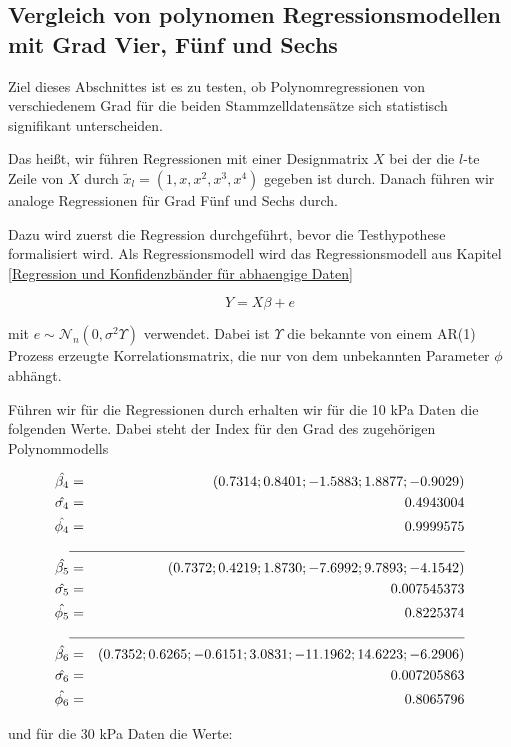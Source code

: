 \documentclass[12pt,a4paper]{article}
\theoremstyle{definition}
\theoremstyle{definition}
\theoremstyle{definition}
\theoremstyle{definition}
\begin{document}
\subsection{Vergleich von polynomen Regressionsmodellen mit  Grad Vier, Fünf und Sechs}
Ziel dieses Abschnittes ist es zu testen, ob Polynomregressionen von verschiedenem Grad für die beiden Stammzelldatensätze sich statistisch signifikant unterscheiden.

Das heißt, wir führen Regressionen mit einer Designmatrix $X$ bei der die $l$-te Zeile von $X$ durch $\tilde{x}_l = (1, x, x^2, x^3, x^4)$ gegeben ist durch. Danach führen wir analoge Regressionen für Grad Fünf und Sechs durch.

Dazu wird zuerst die Regression durchgeführt, bevor die Testhypothese formalisiert wird. Als Regressionsmodell wird das Regressionsmodell aus Kapitel \ref{Regression und Konfidenzbänder für abhaengige Daten} 

\begin{equation*}
Y = X \beta + e
\end{equation*}

mit $e \sim \mathscr{N}_n(0, \sigma^2 \Upsilon)$ verwendet. Dabei ist $\Upsilon$ die bekannte von einem AR(1) Prozess erzeugte Korrelationsmatrix, die nur von dem unbekannten Parameter $\phi$ abhängt.

Führen wir für die Regressionen durch erhalten wir für die 10 kPa Daten die folgenden Werte. Dabei steht der Index für den Grad des zugehörigen Polynommodells

\begin{eqnarray*}
\hat{\beta_{4}} &=& (0.7314 ; 0.8401 ; -1.5883 ; 1.8877 ; -0.9029) \\
\hat{\sigma_{4}} &=& 0.4943004 \\
\hat{\phi_{4}} &=& 0.9999575 \\
\cline{2-3}
\hat{\beta_{5}} &=& (0.7372 ; 0.4219 ; 1.8730 ; -7.6992 ; 9.7893 ; -4.1542) \\
\hat{\sigma_{5}} &=& 0.007545373 \\
\hat{\phi_{5}} &=& 0.8225374 \\
\cline{2-3}
\hat{\beta_{6}} &=& (0.7352 ; 0.6265 ; -0.6151 ; 3.0831 ; -11.1962 ; 14.6223 ; -6.2906)  \\
\hat{\sigma_{6}} &=& 0.007205863 \\
\hat{\phi_{6}} &=& 0.8065796
\end{eqnarray*}

und für die 30 kPa Daten die Werte:
\end{document}
